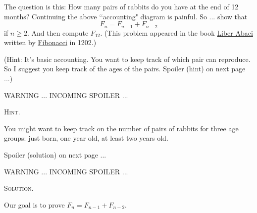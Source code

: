 The question is this:
How many pairs of rabbits do you have at the end of 12 months?
Continuing the above \lq\lq accounting" diagram is painful.
So ... show that
\[
F_n = F_{n - 1} + F_{n - 2}
\]
if $n \geq 2$.
And then compute $F_{12}$.
(This problem appeared in the book
\href{https://en.wikipedia.org/wiki/Liber_Abaci}{Liber Abaci}
written by \href{https://en.wikipedia.org/wiki/Fibonacci}{Fibonacci} in 1202.) 

(Hint: It's basic accounting. You want to keep track of which
pair can reproduce.
So I suggest you keep track of the ages of the pairs.
Spoiler (hint) on next page ...)

\newpage
WARNING ... INCOMING SPOILER ...

\textsc{Hint.}

You might want to keep track on the number of pairs of rabbits for
three age groups: just born, one year old, at least two years old.

Spoiler (solution) on next page ...

\newpage
WARNING ... INCOMING SPOILER ...

\textsc{Solution.}

Our goal is to prove $F_n = F_{n-1} + F_{n-2}$.

